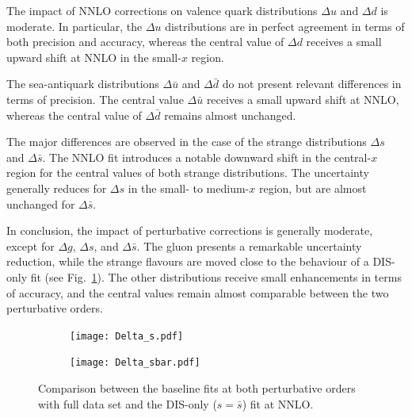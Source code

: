 The impact of NNLO corrections on valence quark distributions $\Delta u$ and $\Delta d$ is moderate. In particular, the $\Delta u$ distributions are in perfect agreement in terms of both precision and accuracy, whereas the central value of $\Delta d$ receives a small upward shift at NNLO in the small-$x$ region.%

The sea-antiquark distributions $\Delta \bar{u}$ and $\Delta \bar{d}$ do not present relevant differences in terms of precision. The central value $\Delta \bar{u}$ receives a small upward shift at NNLO, whereas the central value of $\Delta \bar{d}$ remains almost unchanged.%

The major differences are observed in the case of the strange distributions $\Delta s$ and $\Delta \bar{s}$. The NNLO fit introduces a notable downward shift in the central-$x$ region for the central values of both strange distributions. The uncertainty generally reduces for $\Delta s$ in the small- to medium-$x$ region, but are almost unchanged for $\Delta \bar{s}$.%

In conclusion, the impact of perturbative corrections is generally moderate, except for $\Delta g$, $\Delta s$, and $\Delta \bar{s}$. The gluon presents a remarkable uncertainty reduction, while the strange flavours are moved close to the behaviour of a DIS-only fit (see Fig.~\ref{fig:DIS_only}). The other distributions receive small enhancements in terms of accuracy, and the central values remain almost comparable between the two perturbative orders.

\begin{figure}[t]
  \centering
  \begin{subfigure}[b]{0.45\textwidth}
      \centering
      \texttt{[image: Delta\_s.pdf]}
  \end{subfigure}
  \hfill
  \begin{subfigure}[b]{0.45\textwidth}
      \centering
      \texttt{[image: Delta\_sbar.pdf]}
  \end{subfigure}
     \caption{Comparison between the baseline fits at both perturbative orders with full data set and the DIS-only ($s=\bar{s}$) fit at NNLO.}
     \label{fig:DIS_only}
\end{figure}

